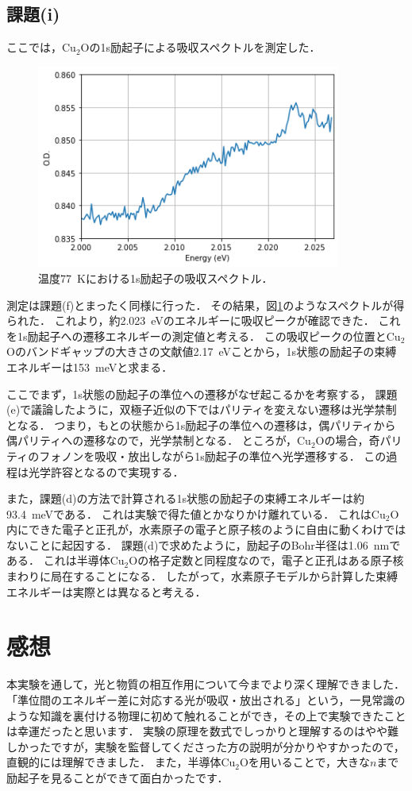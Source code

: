 \documentclass[titlepage]{jsarticle}
\begin{document}
\subsection{課題(i)}
ここでは，Cu$_2$Oの1s励起子による吸収スペクトルを測定した．

\begin{figure}[htbp]
  \centering
  \includegraphics[width=10cm]{Cu2O_1s.png}
  \caption{温度\SI{77}{\kelvin}における1s励起子の吸収スペクトル．}
  \label{fig:Cu2O_1s}
\end{figure}

測定は課題(f)とまったく同様に行った．
その結果，図\ref{fig:Cu2O_1s}のようなスペクトルが得られた．
これより，約\SI{2.023}{\eV}のエネルギーに吸収ピークが確認できた．
これを1s励起子への遷移エネルギーの測定値と考える．
この吸収ピークの位置とCu$_2$Oのバンドギャップの大きさの文献値\SI{2.17}{\eV}ことから，1s状態の励起子の束縛エネルギーは\SI{153}{\meV}と求まる．

ここでまず，1s状態の励起子の準位への遷移がなぜ起こるかを考察する，
課題(e)で議論したように，双極子近似の下ではパリティを変えない遷移は光学禁制となる．
つまり，もとの状態から1s励起子の準位への遷移は，偶パリティから偶パリティへの遷移なので，光学禁制となる．
ところが，Cu$_2$Oの場合，奇パリティのフォノンを吸収・放出しながら1s励起子の準位へ光学遷移する．
この過程は光学許容となるので実現する．

また，課題(d)の方法で計算される1s状態の励起子の束縛エネルギーは約\SI{93.4}{\meV}である．
これは実験で得た値とかなりかけ離れている．
これはCu$_2$O内にできた電子と正孔が，水素原子の電子と原子核のように自由に動くわけではないことに起因する．
課題(d)で求めたように，励起子のBohr半径は\SI{1.06}{\nm}である．
これは半導体Cu$_2$Oの格子定数と同程度なので，電子と正孔はある原子核まわりに局在することになる．
したがって，水素原子モデルから計算した束縛エネルギーは実際とは異なると考える．

\section{感想}
本実験を通して，光と物質の相互作用について今までより深く理解できました．
「準位間のエネルギー差に対応する光が吸収・放出される」という，一見常識のような知識を裏付ける物理に初めて触れることができ，その上で実験できたことは幸運だったと思います．
実験の原理を数式でしっかりと理解するのはやや難しかったですが，実験を監督してくださった方の説明が分かりやすかったので，直観的には理解できました．
また，半導体Cu$_2$Oを用いることで，大きな$n$まで励起子を見ることができて面白かったです．
\end{document}
